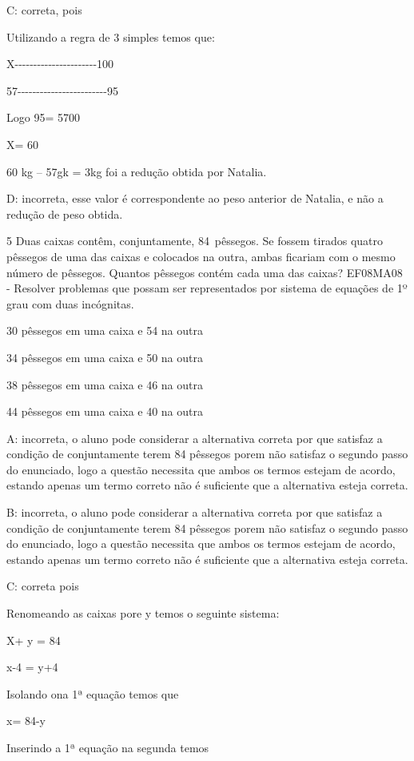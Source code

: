 C: correta, pois

Utilizando a regra de 3 simples temos que:

X-\/-\/-\/-\/-\/-\/-\/-\/-\/-\/-\/-\/-\/-\/-\/-\/-\/-\/-\/-\/-\/-100

57-\/-\/-\/-\/-\/-\/-\/-\/-\/-\/-\/-\/-\/-\/-\/-\/-\/-\/-\/-\/-\/-\/-\/-95

Logo 95\times \times = 5700

X= 60

60 kg -- 57gk = 3kg foi a redução obtida por Natalia.

D: incorreta, esse valor é correspondente ao peso anterior de Natalia, e
não a redução de peso obtida.

\num{5} Duas caixas contêm, conjuntamente, 84~pêssegos. Se fossem tirados
quatro pêssegos de uma das caixas e colocados na outra, ambas ficariam
com o mesmo número de pêssegos. Quantos pêssegos contém cada uma das
caixas? EF08MA08 - Resolver problemas que possam ser representados por
sistema de equações de 1º grau com duas incógnitas.

\item 30 pêssegos em uma caixa e 54 na outra
\item 34 pêssegos em uma caixa e 50 na outra
\item 38 pêssegos em uma caixa e 46 na outra
\item 44 pêssegos em uma caixa e 40 na outra

A: incorreta, o aluno pode considerar a alternativa correta por que
satisfaz a condição de conjuntamente terem 84 pêssegos porem não
satisfaz o segundo passo do enunciado, logo a questão necessita que
ambos os termos estejam de acordo, estando apenas um termo correto não é
suficiente que a alternativa esteja correta.

B: incorreta, o aluno pode considerar a alternativa correta por que
satisfaz a condição de conjuntamente terem 84 pêssegos porem não
satisfaz o segundo passo do enunciado, logo a questão necessita que
ambos os termos estejam de acordo, estando apenas um termo correto não é
suficiente que a alternativa esteja correta.

C: correta pois

Renomeando as caixas por\times e y temos o seguinte sistema:

X+ y = 84

x-4 = y+4

Isolando o\times na 1ª equação temos que

x= 84-y

Inserindo a 1ª equação na segunda temos

